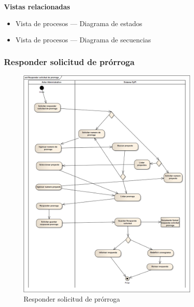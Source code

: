 \documentclass[12pt,oneside,letterpaper]{report}
\begin{document}
\textbf{Vistas relacionadas}
\begin{itemize}
\item Vista de procesos --- Diagrama de estados
\item Vista de procesos --- Diagrama de secuencias
\end{itemize}

\subsubsection{Responder solicitud de prórroga}

\begin{figure}[h!]
  \centering
    \includegraphics[width=0.80\textwidth]{./img/img12.png}
  \caption{Responder solicitud de prórroga}
\end{figure}
\end{document}
